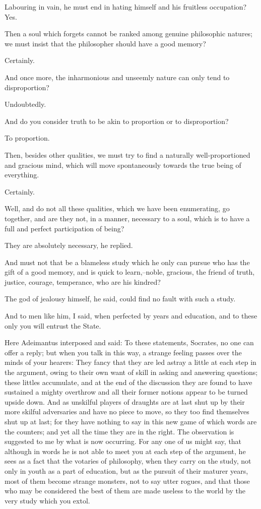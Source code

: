 Labouring in vain, he must end in hating himself and his fruitless
occupation? Yes.

Then a soul which forgets cannot be ranked among genuine philosophic
natures; we must insist that the philosopher should have a good memory?

Certainly.

And once more, the inharmonious and unseemly nature can only tend to
disproportion?

Undoubtedly.

And do you consider truth to be akin to proportion or to disproportion?

To proportion.

Then, besides other qualities, we must try to find a naturally
well-proportioned and gracious mind, which will move spontaneously
towards the true being of everything.

Certainly.

Well, and do not all these qualities, which we have been enumerating, go
together, and are they not, in a manner, necessary to a soul, which is
to have a full and perfect participation of being?

They are absolutely necessary, he replied.

And must not that be a blameless study which he only can pursue who has
the gift of a good memory, and is quick to learn,--noble, gracious, the
friend of truth, justice, courage, temperance, who are his kindred?

The god of jealousy himself, he said, could find no fault with such a
study.

And to men like him, I said, when perfected by years and education, and
to these only you will entrust the State.

Here Adeimantus interposed and said: To these statements, Socrates, no
one can offer a reply; but when you talk in this way, a strange feeling
passes over the minds of your hearers: They fancy that they are led
astray a little at each step in the argument, owing to their own want of
skill in asking and answering questions; these littles accumulate, and
at the end of the discussion they are found to have sustained a mighty
overthrow and all their former notions appear to be turned upside down.
And as unskilful players of draughts are at last shut up by their
more skilful adversaries and have no piece to move, so they too find
themselves shut up at last; for they have nothing to say in this new
game of which words are the counters; and yet all the time they are in
the right. The observation is suggested to me by what is now occurring.
For any one of us might say, that although in words he is not able
to meet you at each step of the argument, he sees as a fact that the
votaries of philosophy, when they carry on the study, not only in youth
as a part of education, but as the pursuit of their maturer years, most
of them become strange monsters, not to say utter rogues, and that those
who may be considered the best of them are made useless to the world by
the very study which you extol.

